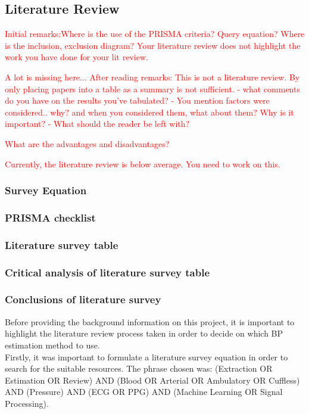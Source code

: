  \subsection{Literature Review}

\textcolor{red}{Initial remarks:Where is the use of the PRISMA criteria? Query equation? Where is the inclusion, exclusion diagram? Your literature review does not highlight the work you have done for your lit review.}

\textcolor{red}{A lot is missing here...}
\textcolor{red}{After reading remarks:}
\textcolor{red}{This is not a literature review. By only placing papers into a table as a summary is not sufficient.}
\textcolor{red}{- what comments do you have on the results you've tabulated?}
\textcolor{red}{- You mention factors were considered.. why? and when you considered them, what about them? Why is it important?}
\textcolor{red}{- What should the reader be left with?}

\textcolor{red}{What are the advantages and disadvantages?}

\textcolor{red}{Currently, the literature review is below average. You need to work on this.}


\subsubsection{Survey Equation}

\subsubsection{PRISMA checklist}

\subsubsection{Literature survey table}

\subsubsection{Critical analysis of literature survey table}

\subsubsection{Conclusions of literature survey}

Before providing the background information on this project, it is important to highlight 
the literature review process taken in order to decide on which BP estimation method to 
use.\\ \newline \noindent Firstly, it was important to formulate a literature survey equation in order to search 
for the suitable resources. The phrase chosen was: 
(Extraction OR Estimation OR Review) AND (Blood OR Arterial OR Ambulatory OR Cuffless) AND (Pressure) AND (ECG OR PPG) AND (Machine Learning OR Signal Processing).

